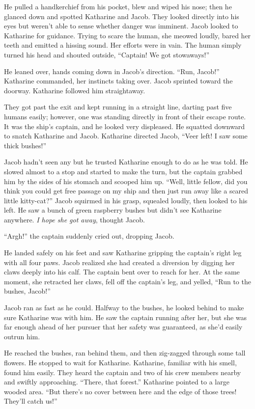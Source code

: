 He pulled a handkerchief from his pocket, blew and wiped his nose; then he glanced down and spotted Katharine and Jacob. They looked directly into his eyes but weren't able to sense whether danger was imminent. Jacob looked to Katharine for guidance. Trying to scare the human, she meowed loudly, bared her teeth and emitted a hissing sound. Her efforts were in vain. The human simply turned his head and shouted outside, “Captain! We got stowaways!”

He leaned over, hands coming down in Jacob's direction. “Run, Jacob!” Katharine commanded, her instincts taking over. Jacob sprinted toward the doorway. Katharine followed him straightaway.

They got past the exit and kept running in a straight line, darting past five humans easily; however, one was standing directly in front of their escape route. It was the ship's captain, and he looked very displeased. He squatted downward to snatch Katharine and Jacob. Katharine directed Jacob, “Veer left! I saw some thick bushes!”

Jacob hadn't seen any but he trusted Katharine enough to do as he was told. He slowed almost to a stop and started to make the turn, but the captain grabbed him by the sides of his stomach and scooped him up. “Well, little fellow, did you think you could get free passage on my ship and then just run away like a scared little kitty-cat?” Jacob squirmed in his grasp, squealed loudly, then looked to his left. He saw a bunch of green raspberry bushes but didn't see Katharine anywhere. \textit{I hope she got away}, thought Jacob.

“Argh!” the captain suddenly cried out, dropping Jacob.

He landed safely on his feet and saw Katharine gripping the captain's right leg with all four paws. Jacob realized she had created a diversion by digging her claws deeply into his calf. The captain bent over to reach for her. At the same moment, she retracted her claws, fell off the captain's leg, and yelled, “Run to the bushes, Jacob!”

Jacob ran as fast as he could. Halfway to the bushes, he looked behind to make sure Katharine was with him. He saw the captain running after her, but she was far enough ahead of her pursuer that her safety was guaranteed, as she'd easily outrun him. %

He reached the bushes, ran behind them, and then zig-zagged through some tall flowers. He stopped to wait for Katharine. Katharine, familiar with his smell, found him easily. They heard the captain and two of his crew members nearby and swiftly approaching. “There, that forest.” Katharine pointed to a large wooded area. “But there's no cover between here and the edge of those trees! They'll catch us!”

